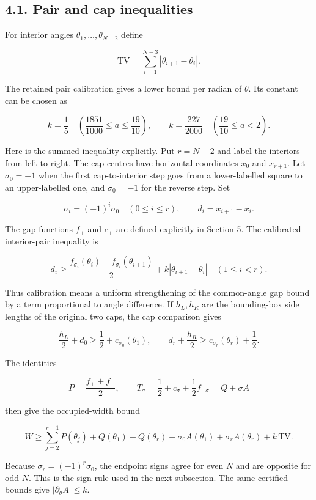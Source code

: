 \documentclass[
  11pt,
  a4paper,
]{article}
\begin{document}
\subsection{4.1. Pair and cap
inequalities}\label{pair-and-cap-inequalities}

For interior angles \(\theta_1,\ldots,\theta_{N-2}\) define

\[
\mathrm{TV}=\sum_{i=1}^{N-3}|\theta_{i+1}-\theta_i|.
\]

The retained pair calibration gives a lower bound per radian of
\(\theta\). Its constant can be chosen as

\[
k=\frac15\quad\left(\frac{1851}{1000}\le a\le\frac{19}{10}\right),
\qquad
k=\frac{227}{2000}\quad\left(\frac{19}{10}\le a<2\right).
\]

Here is the summed inequality explicitly. Put \(r=N-2\) and label the
interiors from left to right. The cap centres have horizontal
coordinates \(x_0\) and \(x_{r+1}\). Let \(\sigma_0=+1\) when the first
cap-to-interior step goes from a lower-labelled square to an
upper-labelled one, and \(\sigma_0=-1\) for the reverse step. Set

\[
\sigma_i=(-1)^i\sigma_0\quad(0\le i\le r),\qquad
d_i=x_{i+1}-x_i.
\]

The gap functions \(f_\pm\) and \(c_\pm\) are defined explicitly in
Section 5. The calibrated interior-pair inequality is

\[
d_i\ge\frac{f_{\sigma_i}(\theta_i)+f_{\sigma_i}(\theta_{i+1})}{2}
+k|\theta_{i+1}-\theta_i|\quad(1\le i<r).
\]

Thus calibration means a uniform strengthening of the common-angle gap
bound by a term proportional to angle difference. If \(h_L,h_R\) are the
bounding-box side lengths of the original two caps, the cap comparison
gives

\[
\frac{h_L}{2}+d_0\ge\frac12+c_{\sigma_0}(\theta_1),\qquad
d_r+\frac{h_R}{2}\ge c_{\sigma_r}(\theta_r)+\frac12.
\]

The identities

\[
P=\frac{f_++f_-}{2},\qquad
T_\sigma=\frac12+c_\sigma+\frac12f_{-\sigma}=Q+\sigma A
\]

then give the occupied-width bound

\[
W\ge\sum_{j=2}^{r-1}P(\theta_j)
+Q(\theta_1)+Q(\theta_r)
+\sigma_0 A(\theta_1)+\sigma_r A(\theta_r)+k\,\mathrm{TV}.
\]

Because \(\sigma_r=(-1)^r\sigma_0\), the endpoint signs agree for even
\(N\) and are opposite for odd \(N\). This is the sign rule used in the
next subsection. The same certified bounds give
\(|\partial_\theta A|\le k\).
\end{document}
